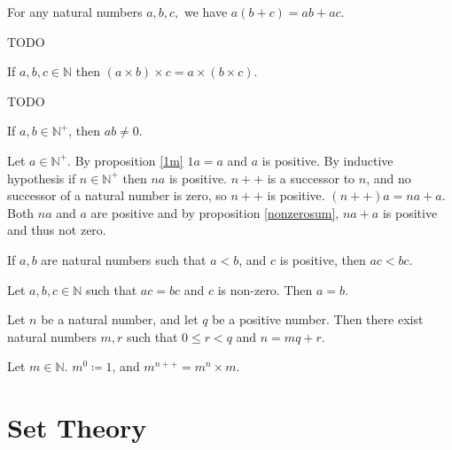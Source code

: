 \documentclass{article}
\begin{document}
\begin{proposition}
	For any natural numbers \(a,b,c,\) we have \(a(b+c)=ab+ac\).
\end{proposition}
\begin{IEEEproof}
	TODO
\end{IEEEproof}
\begin{proposition}
	If \(a,b,c\in\mathbb{N}\) then \((a\times b)\times c=a\times(b\times c)\).
\end{proposition}
\begin{IEEEproof}
	TODO
\end{IEEEproof}
\begin{proposition}
	\label{posinatmult}
	If \(a,b\in\mathbb{N}^+\), then \(ab\neq 0\).
\end{proposition}
	\begin{IEEEproof}
		Let \(a\in\mathbb{N}^+\). By proposition \ref{1m} \(1a=a\) and \(a\) is positive. By inductive hypothesis if \(n\in\mathbb{N}^+\) then \(na\) is positive. \(n++\) is a successor to \(n\), and no successor of a natural number is zero, so \(n++\) is positive. \((n++)a=na+a\). Both \(na\) and \(a\) are positive and by proposition \ref{nonzerosum}, \(na+a\) is positive and thus not zero.
	\end{IEEEproof}
\begin{proposition}
	If \(a,b\) are natural numbers such that \(a<b\), and \(c\) is positive, then \(ac<bc\).
\end{proposition}
\begin{corollary}
	Let \(a,b,c\in\mathbb{N}\) such that \(ac=bc\) and \(c\) is non-zero. Then \(a=b\).
\end{corollary}
\begin{proposition}
	Let \(n\) be a natural number, and let \(q\) be a positive number. Then there exist natural numbers \(m,r\) such that \(0\leq r<q\) and \(n=mq+r\).
\end{proposition}
\begin{definition}
	Let \(m\in\mathbb{N}\). \(m^0\coloneq 1\), and \(m^{n++}=m^n\times m\).
\end{definition}
\section{Set Theory}
\end{document}
